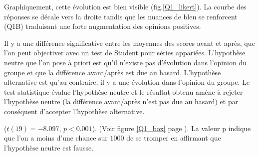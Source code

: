 \documentclass[12pt,english,french]{article}\usepackage{graphicx, color}
\begin{document}
Graphiquement, cette évolution est bien visible (fig.\ref{Q1_likert}). La courbe des réponses se décale vers la droite tandis que les nuances de bleu se renforcent (Q1B) traduisant une forte augmentation des opinions positives.

Il y a une différence significative entre les moyennes des scores avant et après, que l'on peut objectiver avec un test de Student pour séries appariées. L'hypothèse neutre que l'on pose à priori est qu'il n'existe pas d'évolution dans l'opinion du groupe et que la différence avant/après est due au hasard. L'hypothèse alternative est qu'au contraire, il y a une évolution dans l'opinion du groupe. Le test statistique évalue l'hypothèse neutre  et le résultat obtenu amène à rejeter l'hypothèse neutre (la différence avant/après n'est pas due au hasard) et par conséquent d'accepter l'hypothèse alternative.

($t(19)=-8.097$,
$p < 0.001$).
(Voir figure \ref{Q1_box} page \pageref{Q1_box}).
La valeur p indique que l'on a moins d'une chance sur $1000$ de se tromper en affirmant que l'hypothèse neutre est fausse.
\end{document}
